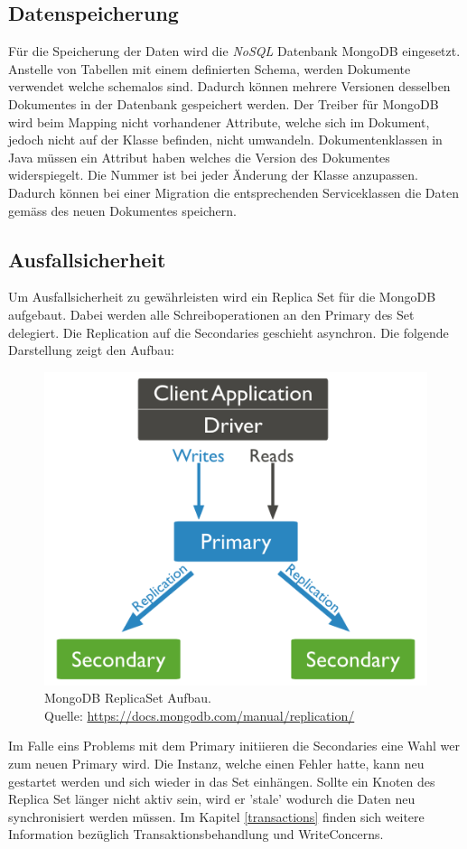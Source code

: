 \subsection{Datenspeicherung}
Für die Speicherung der Daten wird die \textit{\gls{NoSQL}} Datenbank MongoDB eingesetzt. Anstelle von Tabellen mit einem definierten Schema, werden Dokumente verwendet welche schemalos sind. Dadurch können mehrere Versionen desselben Dokumentes in der Datenbank gespeichert werden. Der Treiber für MongoDB wird beim Mapping nicht vorhandener Attribute, welche sich im Dokument, jedoch nicht auf der Klasse befinden, nicht umwandeln.\newline
Dokumentenklassen in Java müssen ein Attribut haben welches die Version des Dokumentes widerspiegelt. Die Nummer ist bei jeder Änderung der Klasse anzupassen. Dadurch können bei einer Migration die entsprechenden Serviceklassen die Daten gemäss des neuen Dokumentes speichern.

\subsection{Ausfallsicherheit}

Um Ausfallsicherheit zu gewährleisten wird ein Replica Set für die MongoDB aufgebaut. Dabei werden alle Schreiboperationen an den Primary des Set delegiert. Die Replication auf die Secondaries geschieht asynchron. Die folgende Darstellung zeigt den Aufbau:
\begin{figure}[H]
	\centering
	\includegraphics[scale=0.6]{mongodb-replicaset.png}
	\caption{MongoDB ReplicaSet Aufbau. \\ Quelle: \url{https://docs.mongodb.com/manual/replication/}}	
\end{figure}
Im Falle eins Problems mit dem Primary initiieren die Secondaries eine Wahl wer zum neuen Primary wird. Die Instanz, welche einen Fehler hatte, kann neu gestartet werden und sich wieder in das Set einhängen. Sollte ein Knoten des Replica Set länger nicht aktiv sein, wird er 'stale' wodurch die Daten neu synchronisiert werden müssen. Im Kapitel \ref{transactions} finden sich weitere Information bezüglich Transaktionsbehandlung und WriteConcerns.

